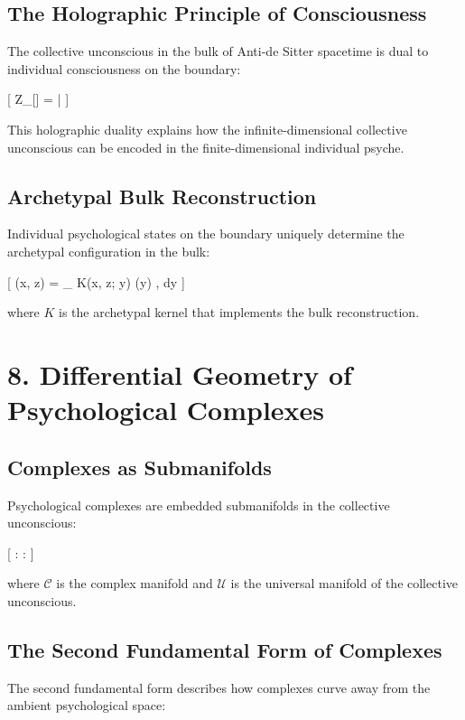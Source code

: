 \documentclass[12pt]{article}
\begin{document}
\subsection*{The Holographic Principle of Consciousness}

The collective unconscious in the bulk of Anti-de Sitter spacetime is dual to individual consciousness on the boundary:

[
Z_{}[] = \langle {} |  \rangle
]

This holographic duality explains how the infinite-dimensional collective unconscious can be encoded in the finite-dimensional individual psyche.

\subsection*{Archetypal Bulk Reconstruction}

Individual psychological states on the boundary uniquely determine the archetypal configuration in the bulk:

[
(x, z) = \int_{} K(x, z; y) (y) , dy
]

where $K$ is the archetypal kernel that implements the bulk reconstruction.

\section*{8. Differential Geometry of Psychological Complexes}

\subsection*{Complexes as Submanifolds}

Psychological complexes are embedded submanifolds in the collective unconscious:

[
: \quad \phi:  \rightarrow {}
]

where $\mathcal{C}$ is the complex manifold and $\mathcal{U}$ is the universal manifold of the collective unconscious.

\subsection*{The Second Fundamental Form of Complexes}

The second fundamental form describes how complexes curve away from the ambient psychological space:
\end{document}
